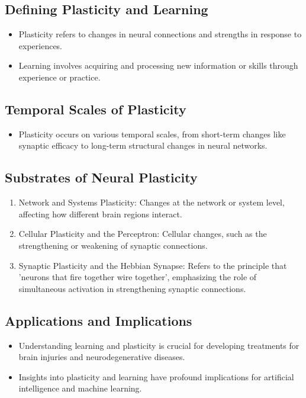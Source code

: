 \documentclass{article}
\begin{document}
\subsection{Defining Plasticity and Learning}
\begin{itemize}
    \item Plasticity refers to changes in neural connections and strengths in response to experiences.
    \item Learning involves acquiring and processing new information or skills through experience or practice.
\end{itemize}

\subsection{Temporal Scales of Plasticity}
\begin{itemize}
    \item Plasticity occurs on various temporal scales, from short-term changes like synaptic efficacy to long-term structural changes in neural networks.
\end{itemize}

\subsection{Substrates of Neural Plasticity}
\begin{enumerate}
    \item Network and Systems Plasticity: Changes at the network or system level, affecting how different brain regions interact.
    \item Cellular Plasticity and the Perceptron: Cellular changes, such as the strengthening or weakening of synaptic connections.
    \item Synaptic Plasticity and the Hebbian Synapse: Refers to the principle that 'neurons that fire together wire together', emphasizing the role of simultaneous activation in strengthening synaptic connections.
\end{enumerate}

\subsection{Applications and Implications}
\begin{itemize}
    \item Understanding learning and plasticity is crucial for developing treatments for brain injuries and neurodegenerative diseases.
    \item Insights into plasticity and learning have profound implications for artificial intelligence and machine learning.
\end{itemize}
\end{document}
